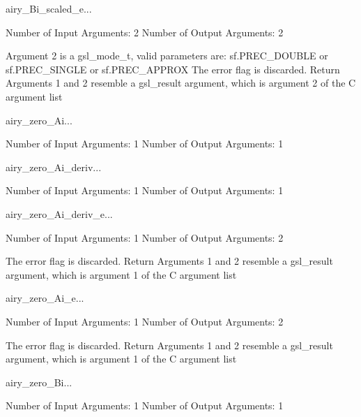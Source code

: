 \begin{funcdesc}{airy_Bi_scaled_e}{...}

    Number of Input  Arguments:  2
    Number of Output Arguments:  2

 Argument 2 is a gsl_mode_t, valid parameters are:
	sf.PREC_DOUBLE or sf.PREC_SINGLE or sf.PREC_APPROX
The error flag is discarded.
Return Arguments 1 and 2 resemble a gsl_result argument,
	which is  argument 2 of the C argument list

\end{funcdesc}

\begin{funcdesc}{airy_zero_Ai}{...}

    Number of Input  Arguments:  1
    Number of Output Arguments:  1
\end{funcdesc}

\begin{funcdesc}{airy_zero_Ai_deriv}{...}

    Number of Input  Arguments:  1
    Number of Output Arguments:  1
\end{funcdesc}

\begin{funcdesc}{airy_zero_Ai_deriv_e}{...}

    Number of Input  Arguments:  1
    Number of Output Arguments:  2

The error flag is discarded.
Return Arguments 1 and 2 resemble a gsl_result argument,
	which is  argument 1 of the C argument list

\end{funcdesc}

\begin{funcdesc}{airy_zero_Ai_e}{...}

    Number of Input  Arguments:  1
    Number of Output Arguments:  2

The error flag is discarded.
Return Arguments 1 and 2 resemble a gsl_result argument,
	which is  argument 1 of the C argument list

\end{funcdesc}

\begin{funcdesc}{airy_zero_Bi}{...}

    Number of Input  Arguments:  1
    Number of Output Arguments:  1
\end{funcdesc}

